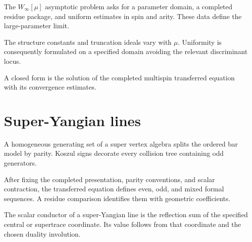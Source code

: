 \begin{theorem}
\label{thm:shadow-tower-w-infinity-asymptotic}
\ClaimStatusOpen
The \(W_\infty[\mu]\) asymptotic problem asks for a parameter domain,
a completed residue package, and uniform estimates in spin and arity.
These data define the large-parameter limit.
\end{theorem}

\begin{remark}
\label{rem:w-infinity-mu-dependence-open}
The structure constants and truncation ideals vary with \(\mu\).
Uniformity is consequently formulated on a specified domain avoiding
the relevant discriminant locus.
\end{remark}

\begin{remark}
\label{rem:c-w-infinity-closed-form-open}
A closed form is the solution of the completed multispin transferred
equation with its convergence estimates.
\end{remark}

\section{Super-Yangian lines}
\label{sec:super-yangian-shadow}

\begin{proposition}
\label{prop:super-yangian-fermionic-line}
\ClaimStatusProvedHere
A homogeneous generating set of a super vertex algebra splits the
ordered bar model by parity.  Koszul signs decorate every collision
tree containing odd generators.
\end{proposition}

\begin{proposition}
\label{prop:super-yangian-tline-shadow}
\ClaimStatusConditional
After fixing the completed presentation, parity conventions, and
scalar contraction, the transferred equation defines even, odd, and
mixed formal sequences.  A residue comparison identifies them with
geometric coefficients.
\end{proposition}

\begin{proposition}
\label{prop:super-yangian-kappa}
\ClaimStatusConditional
The scalar conductor of a super-Yangian line is the reflection sum of
the specified central or supertrace coordinate.  Its value follows
from that coordinate and the chosen duality involution.
\end{proposition}

